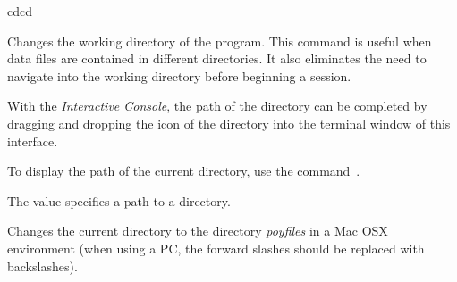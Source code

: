 \begin{command}{cd}{cd}

\syntax{\obligatory{(\poystring)}}

\begin{poydescription}
Changes the working directory of the program. This command is useful
when data files are contained in different directories. It also
eliminates the need to navigate into the working directory before
beginning a \poy session. 

With the \emph{Interactive Console}, the path of the directory can be completed 
by dragging and dropping the icon of the directory into the terminal window of this interface. 

To display the path of the current directory, use the command~.
\end{poydescription}

\begin{arguments}
{The value specifies a path to a directory.}
{}
\end{arguments}

\begin{poyexamples}

{Changes the current directory to the directory \emph{poyfiles} in a Mac OSX 
environment (when using a PC, the forward slashes should be replaced with backslashes).}


\end{poyexamples}

\begin{poyalso}
\end{poyalso}

\end{command}


